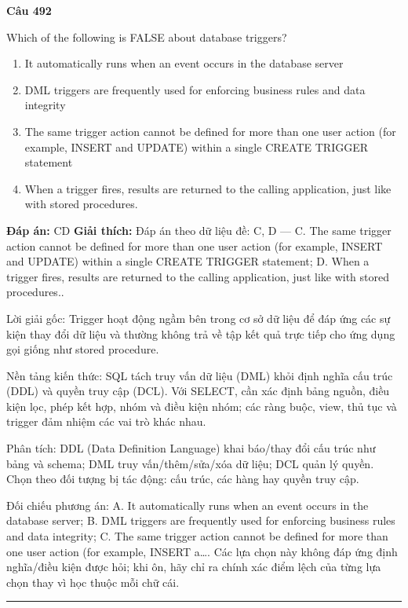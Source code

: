 \documentclass[11pt,a4paper]{article}
\newenvironment{question}[1]{%
  \par\vspace{1em}\noindent\textbf{\large Câu #1}\par\vspace{0.4em}
}{%
  \par\vspace{1em}\hrule\vspace{0.6em}
}
\newenvironment{choices}{%
  \begin{enumerate}[label=\textbf{\Alph*.},leftmargin=2.2em,itemsep=2pt,topsep=3pt]
}{%
  \end{enumerate}
}
\newcommand{\choice}{\item}
\begin{document}
\begin{question}{492}
Which of the following is FALSE about database triggers?
\begin{choices}
\choice It automatically runs when an event occurs in the database server
\choice DML triggers are frequently used for enforcing business rules and data integrity
\choice The same trigger action cannot be defined for more than one user action (for example, INSERT and UPDATE) within a single CREATE TRIGGER statement
\choice When a trigger fires, results are returned to the calling application, just like with stored procedures.
\end{choices}
\textbf{Đáp án:} CD
\textbf{Giải thích:} Đáp án theo dữ liệu đề: C, D — C. The same trigger action cannot be defined for more than one user action (for example, INSERT and UPDATE) within a single CREATE TRIGGER statement; D. When a trigger fires, results are returned to the calling application, just like with stored procedures..

Lời giải gốc: Trigger hoạt động ngầm bên trong cơ sở dữ liệu để đáp ứng các sự kiện thay đổi dữ liệu và thường không trả về tập kết quả trực tiếp cho ứng dụng gọi giống như stored procedure.

Nền tảng kiến thức: SQL tách truy vấn dữ liệu (DML) khỏi định nghĩa cấu trúc (DDL) và quyền truy cập (DCL). Với SELECT, cần xác định bảng nguồn, điều kiện lọc, phép kết hợp, nhóm và điều kiện nhóm; các ràng buộc, view, thủ tục và trigger đảm nhiệm các vai trò khác nhau.

Phân tích: DDL (Data Definition Language) khai báo/thay đổi cấu trúc như bảng và schema; DML truy vấn/thêm/sửa/xóa dữ liệu; DCL quản lý quyền. Chọn theo đối tượng bị tác động: cấu trúc, các hàng hay quyền truy cập.

Đối chiếu phương án: A. It automatically runs when an event occurs in the database server; B. DML triggers are frequently used for enforcing business rules and data integrity; C. The same trigger action cannot be defined for more than one user action (for example, INSERT a…. Các lựa chọn này không đáp ứng định nghĩa/điều kiện được hỏi; khi ôn, hãy chỉ ra chính xác điểm lệch của từng lựa chọn thay vì học thuộc mỗi chữ cái.
\end{question}
\end{document}
